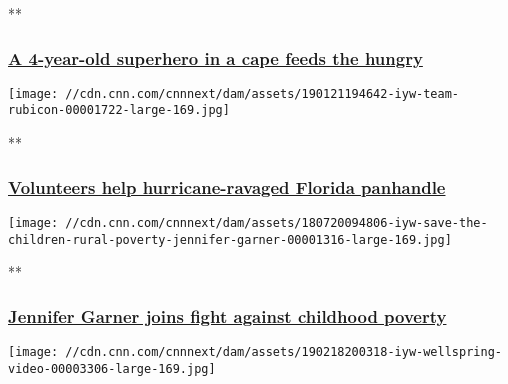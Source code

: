 **

\hypertarget{a-4-year-old-superhero-in-a-cape-feeds-the-hungry-}{%
\subsubsection{\texorpdfstring{\href{/videos/tv/2018/05/21/iyw-boy-helps-homeless-trnd.cnn/video/playlists/impact-your-world/}{A
4-year-old superhero in a cape feeds the hungry
}}{A 4-year-old superhero in a cape feeds the hungry }}\label{a-4-year-old-superhero-in-a-cape-feeds-the-hungry-}}

\href{/videos/tv/2019/01/22/iyw-team-rubicon.cnn/video/playlists/impact-your-world/}{}

\texttt{[image: //cdn.cnn.com/cnnnext/dam/assets/190121194642-iyw-team-rubicon-00001722-large-169.jpg]}

**

\hypertarget{volunteers-help-hurricane-ravaged-florida-panhandle}{%
\subsubsection{\texorpdfstring{\href{/videos/tv/2019/01/22/iyw-team-rubicon.cnn/video/playlists/impact-your-world/}{Volunteers
help hurricane-ravaged Florida
panhandle}}{Volunteers help hurricane-ravaged Florida panhandle}}\label{volunteers-help-hurricane-ravaged-florida-panhandle}}

\href{/videos/tv/2018/07/20/iyw-save-the-children-rural-poverty-jennifer-garner.cnn/video/playlists/impact-your-world/}{}

\texttt{[image: //cdn.cnn.com/cnnnext/dam/assets/180720094806-iyw-save-the-children-rural-poverty-jennifer-garner-00001316-large-169.jpg]}

**

\hypertarget{jennifer-garner-joins-fight-against-childhood-poverty-}{%
\subsubsection{\texorpdfstring{\href{/videos/tv/2018/07/20/iyw-save-the-children-rural-poverty-jennifer-garner.cnn/video/playlists/impact-your-world/}{Jennifer
Garner joins fight against childhood poverty
}}{Jennifer Garner joins fight against childhood poverty }}\label{jennifer-garner-joins-fight-against-childhood-poverty-}}

\href{/videos/tv/2019/02/19/iyw-wellspring-video.cnn/video/playlists/impact-your-world/}{}

\texttt{[image: //cdn.cnn.com/cnnnext/dam/assets/190218200318-iyw-wellspring-video-00003306-large-169.jpg]}

